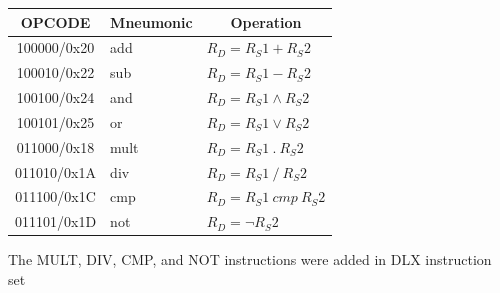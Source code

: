 \documentclass{article}
\begin{document}
  \FloatBarrier
  \begin{table}[H]
    \begin{center}
      \begin{tabular}[pos]{| c | l | l |} \hline 	
      \multicolumn{1}{|c|}{\cellcolor[gray]{0.9}\textbf{OPCODE}} & 
      \multicolumn{1}{c|}{\cellcolor[gray]{0.9}\textbf{Mneumonic}} & 
      \multicolumn{1}{c|}{\cellcolor[gray]{0.9}\textbf{Operation}} \\ \hline
	 100000/0x20 	& add & $R_D = R_S1 + R_S2$ \\ \hline
	 100010/0x22 	& sub & $R_D = R_S1 - R_S2$ \\ \hline
	 100100/0x24 	& and & $R_D = R_S1 \land R_S2$ \\ \hline
	 100101/0x25 & or & $R_D = R_S1 \lor R_S2$ \\ \hline
	 011000/0x18 & mult & $R_D = R_S1 ~.~ R_S2$ \\ \hline
	 011010/0x1A & div & $R_D = R_S1 ~/~ R_S2$ \\ \hline
	 011100/0x1C & cmp & $R_D = R_S1 ~cmp~ R_S2$ \\ \hline
	 011101/0x1D & not & $R_D = \lnot R_S2$ \\ \hline

      \end{tabular}
    \end{center}
  \end{table} 

The MULT, DIV, CMP, and NOT instructions were added in DLX instruction set
\end{document}
